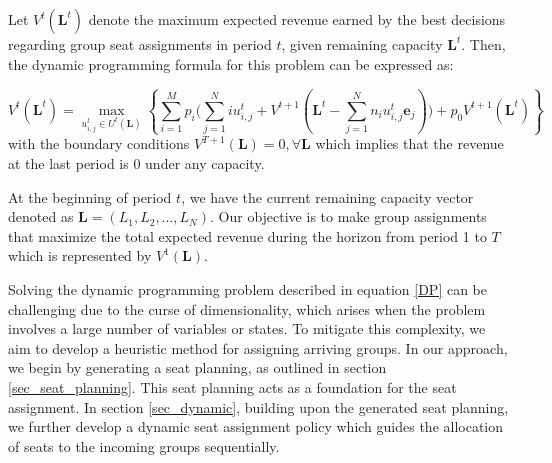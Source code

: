 Let $V^{t}(\mathbf{L}^{t})$ denote the maximum expected revenue earned by the best decisions regarding group seat assignments in period $t$, given remaining capacity $\mathbf{L}^{t}$. Then, the dynamic programming formula for this problem can be expressed as:

\begin{equation}\label{DP}
V^{t}(\mathbf{L}^{t}) = \max_{u_{i,j}^{t} \in U^{t}(\mathbf{L})}\left\{ \sum_{i=1}^{M} p_i \bigl( \sum_{j=1}^{N} i u_{i,j}^{t} + V^{t+1}(\mathbf{L}^{t}- \sum_{j=1}^{N} n_i u_{i,j}^{t}\mathbf{e}_j)\bigr) + p_0 V^{t+1}(\mathbf{L}^{t})\right\}
\end{equation}
with the boundary conditions $V^{T+1}(\mathbf{L}) = 0, \forall \mathbf{L}$ which implies that the revenue at the last period is 0 under any capacity.

At the beginning of period $t$, we have the current remaining capacity vector denoted as $\mathbf{L} = (L_1, L_2, \ldots, L_N)$. Our objective is to make group assignments that maximize the total expected revenue during the horizon from period 1 to $T$ which is represented by $V^{1}(\mathbf{L})$.

Solving the dynamic programming problem described in equation \eqref{DP} can be challenging due to the curse of dimensionality, which arises when the problem involves a large number of variables or states. To mitigate this complexity, we aim to develop a heuristic method for assigning arriving groups. In our approach, we begin by generating a seat planning, as outlined in section \ref{sec_seat_planning}. This seat planning acts as a foundation for the seat assignment. In section \ref{sec_dynamic}, building upon the generated seat planning, we further develop a dynamic seat assignment policy which guides the allocation of seats to the incoming groups sequentially. 




